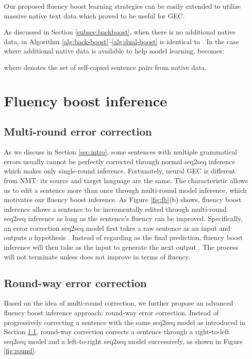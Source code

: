 \documentclass{article} \usepackage{MSRA_TR,times}
\begin{document}
Our proposed fluency boost learning strategies can be easily extended to utilize massive native text data which proved to be useful for GEC.

As discussed in Section \ref{subsec:backboost}, when there is no additional native data,  in Algorithm \ref{alg:back-boost}--\ref{alg:dual-boost} is identical to . In the case where additional native data is available to help model learning,  becomes:

\vspace{-0.5cm}
\vspace{-0.6cm}

\noindent where  denotes the set of self-copied sentence pairs from native data.

\section{Fluency boost inference}
\subsection{Multi-round error correction}\label{subsec:multiround}

As we discuss in Section \ref{sec:intro}, some sentences with multiple grammatical errors usually cannot be perfectly corrected through normal seq2seq inference which makes only single-round inference. Fortunately, neural GEC is different from NMT: its source and target language are the same. The characteristic allows us to edit a sentence more than once through multi-round model inference, which motivates our fluency boost inference. As Figure \ref{fig:fb}(b) shows, fluency boost inference allows a sentence to be incrementally edited through multi-round seq2seq inference as long as the sentence's fluency can be improved. Specifically, an error correction seq2seq model first takes a raw sentence  as an input and outputs a hypothesis . Instead of regarding  as the final prediction, fluency boost inference will then take  as the input to generate the next output . The process will not terminate unless  does not improve  in terms of fluency. 

\subsection{Round-way error correction}\label{subsec:round-way}
Based on the idea of multi-round correction, we further propose an advanced fluency boost inference approach: round-way error correction. Instead of progressively correcting a sentence with the same seq2seq model as introduced in Section \ref{subsec:multiround}, round-way correction corrects a sentence through a right-to-left seq2seq model and a left-to-right seq2seq model successively, as shown in Figure \ref{fig:round}.
\end{document}
